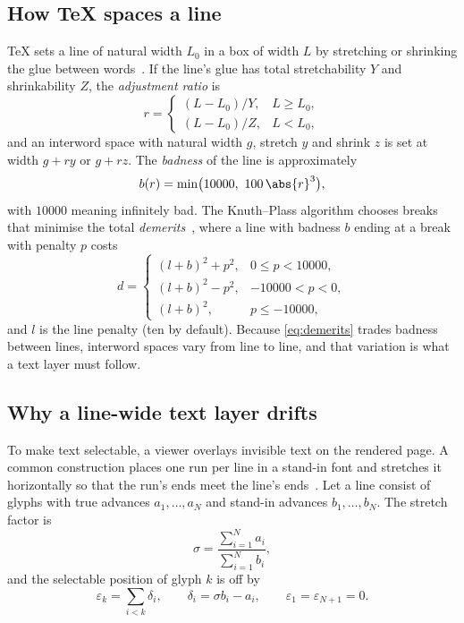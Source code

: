 \subsection{How \TeX{} spaces a line}

\TeX{} sets a line of natural width $L_0$ in a box of width $L$ by stretching or
shrinking the glue between words~\cite{knuth1984}. If the line's glue has total
stretchability $Y$ and shrinkability $Z$, the \emph{adjustment ratio} is
\begin{equation}
  r =
  \begin{cases}
    (L - L_0)/Y, & L \ge L_0,\\
    (L - L_0)/Z, & L < L_0,
  \end{cases}
  \label{eq:ratio}
\end{equation}
and an interword space with natural width $g$, stretch $y$ and shrink $z$ is
set at width $g + r y$ or $g + r z$. The \emph{badness} of the line is
approximately
\begin{equation}
  b(r) = \min\bigl(10000,\ 100\,\abs{r}^{3}\bigr),
  \label{eq:badness}
\end{equation}
with $10000$ meaning infinitely bad. The Knuth--Plass algorithm chooses breaks
that minimise the total \emph{demerits}~\cite{knuth1981}, where a line with
badness $b$ ending at a break with penalty $p$ costs
\begin{equation}
  d =
  \begin{cases}
    (l + b)^{2} + p^{2}, & 0 \le p < 10000,\\
    (l + b)^{2} - p^{2}, & -10000 < p < 0,\\
    (l + b)^{2}, & p \le -10000,
  \end{cases}
  \label{eq:demerits}
\end{equation}
and $l$ is the line penalty (ten by default). Because \cref{eq:demerits}
trades badness between lines, interword spaces vary from line to line, and
that variation is what a text layer must follow.

\subsection{Why a line-wide text layer drifts}

To make text selectable, a viewer overlays invisible text on the rendered page.
A common construction places one run per line in a stand-in font and stretches
it horizontally so that the run's ends meet the line's ends~\cite{pdfjs}. Let a
line consist of glyphs with true advances $a_1, \dots, a_N$ and stand-in
advances $b_1, \dots, b_N$. The stretch factor is
\begin{equation}
  \sigma = \frac{\sum_{i=1}^{N} a_i}{\sum_{i=1}^{N} b_i},
\end{equation}
and the selectable position of glyph $k$ is off by
\begin{equation}
  \varepsilon_k = \sum_{i<k} \delta_i, \qquad
  \delta_i = \sigma b_i - a_i, \qquad
  \varepsilon_1 = \varepsilon_{N+1} = 0 .
  \label{eq:drift}
\end{equation}


